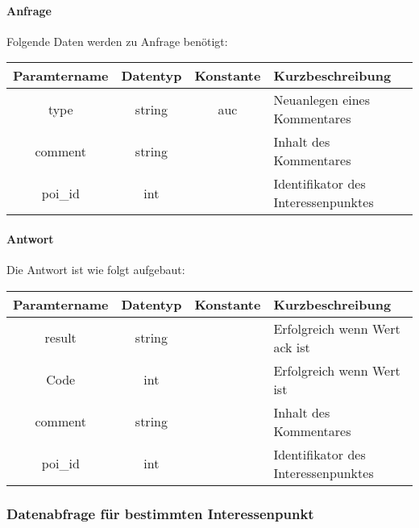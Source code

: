 \paragraph{Anfrage}Folgende Daten werden zu Anfrage benötigt:
\begin{table}[H]
	\begin{tabular}{|c|c|c|p{6.5cm}|}
		\hline
		\textbf{Paramtername} & \textbf{Datentyp} & \textbf{Konstante} & \textbf{Kurzbeschreibung}                                                                                               \\ \hline
		type                & string            & auc                & Neuanlegen eines Kommentares \\ \hline
		comment             & string            &                    & Inhalt des Kommentares \\ \hline
		poi\_id             & int               &                    & Identifikator des Interessenpunktes \\ \hline
	\end{tabular}
\end{table}
\paragraph{Antwort}Die Antwort ist wie folgt aufgebaut:
\begin{table}[H]
	\begin{tabular}{|c|c|c|p{6.5cm}|}
		\hline
		\textbf{Paramtername} & \textbf{Datentyp} & \textbf{Konstante} & \textbf{Kurzbeschreibung}                                                                                               \\ \hline
		result              & string           &                 & Erfolgreich wenn Wert {\glqq ack\grqq} ist \\ \hline
		Code                & int              &                 & Erfolgreich wenn Wert {\glqq 0\grqq} ist \\ \hline
		comment             & string           &                 & Inhalt des Kommentares \\ \hline
		poi\_id             & int              &                 & Identifikator des Interessenpunktes \\ \hline
	\end{tabular}
\end{table}
\subsubsection{Datenabfrage für bestimmten Interessenpunkt}
